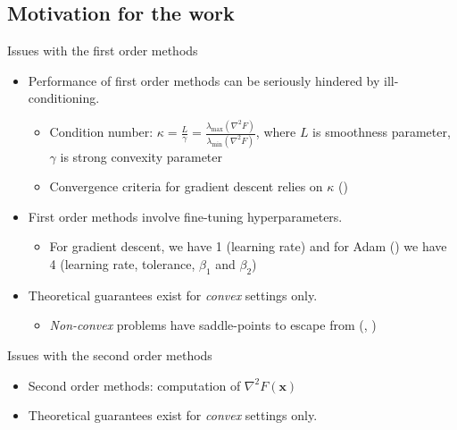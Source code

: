 \documentclass[10pt]{beamer}
\newcommand{\h}{\nabla^{2}}
\newcommand{\xbold}{\mathbf{x}}
\newcommand{\mineig}{\lambda_{\min}}
\newcommand{\maxeig}{\lambda_{\max}}
\begin{document}
\subsection{Motivation for the work}
\begin{frame}{Issues with the first order methods}
  \begin{itemize}
  \item<1->{
    Performance of first order methods can be seriously hindered by ill-conditioning.
    \begin{itemize}    
        \item<2->{Condition number: \(\kappa = \frac{L}{\gamma} = \frac{\maxeig(\h F)}{\mineig(\h F)}\), where \(L\) is smoothness parameter, \(\gamma\) is strong convexity parameter}
        \item<3->{Convergence criteria for gradient descent relies on \(\kappa\) (\cite{benrecht-simons})}
    \end{itemize}
  }
  \item<4->{
    First order methods involve fine-tuning hyperparameters.
    \begin{itemize}    
        \item<5->{For gradient descent, we have 1 (learning rate) and for Adam (\cite{adam-iclr}) we have 4 (learning rate, tolerance, \(\beta_{1}\) and \(\beta_{2}\))}
    \end{itemize}
  }
  \item<6->{
    Theoretical guarantees exist for \emph{convex} settings only.
    \begin{itemize}    
        \item<7->{\emph{Non-convex} problems have saddle-points to escape from (\cite{du-nips}, \cite{jin-icml})}
    \end{itemize}
  }
  \end{itemize}
\end{frame}

\begin{frame}{Issues with the second order methods}
  \begin{itemize}
  \item<1-> {
    Second order methods: computation of \(\h F(\xbold)\)
    \begin{itemize}
    \end{itemize}
  }
  \item<4->{
    Theoretical guarantees exist for \emph{convex} settings only.
  }
  \end{itemize}
\end{frame}
\end{document}
